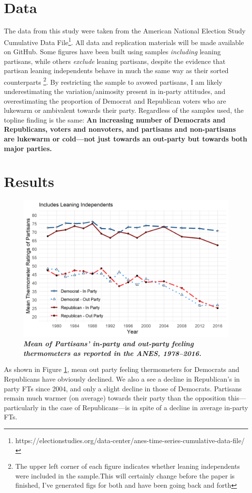 \documentclass[12pt]{paper}
\begin{document}
\section{Data}

The data from this study were taken from the American National Election Study Cumulative Data File\footnote{https://electionstudies.org/data-center/anes-time-series-cumulative-data-file/}. All data and replication materials will be made available on GitHub. Some figures have been built using samples \textit{including} leaning partisans, while others \textit{exclude} leaning partisans, despite the evidence that partisan leaning independents behave in much the same way as their sorted counterparts \citep{klar2016independent}\footnote{The upper left corner of each figure indicates whether leaning independents were included in the sample.This will certainly change before the paper is finished, I've generated figs for both and have been going back and forth}. By restricting the sample to avowed partisans, I am likely underestimating the variation/animosity present in in-party attitudes, and overestimating the proportion of Democrat and Republican voters who are lukewarm or ambivalent towards their party. Regardless of the samples used, the topline finding is the same: \textbf{An increasing number of Democrats and Republicans, voters and nonvoters, and partisans and non-partisans are lukewarm or cold---not just towards an out-party but towards both major parties.}


\section{Results}

\begin{figure}[H]
\centering
\includegraphics[width=.8\textwidth]{cdf-mean-ns.png}
\caption{\label{fig:cdf-mean} \textit{\textbf{Mean of Partisans' in-party and out-party feeling thermometers as reported in the ANES, 1978--2016.}%
}}
\end{figure}
As shown in Figure \ref{fig:cdf-mean}, mean out party feeling thermometers for Democrats and Republicans have obviously declined. We also a see a decline in Republican's in party FTs since 2004, and only a slight decline in those of Democrats. Partisans remain much warmer (on average) towards their party than the opposition this---particularly in the case of Republicans---is in spite of a decline in average in-party FTs.
\end{document}
